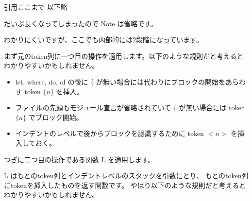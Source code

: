 \documentclass[mingoth,a4paper]{jsarticle}
\begin{document}



\dotfill 引用ここまで 以下略 \dotfill

だいぶ長くなってしまったので Note は省略です。

わかりにくいですが、ここでも内部的には2段階になっています。

まず元のtoken列に一つ目の操作を適用します。以下のような規則だと考えるとわかりやすいかもしれません。

\begin{itemize}
 \item let, where, do, of の後に \{ が無い場合には代わりにブロックの開始をあらわす token $\{n\}$ を挿入。
 \item ファイルの先頭もモジュール宣言が省略されていて \{ が無い場合には token $\{n\}$ でブロック開始。
 \item インデントのレベルで後からブロックを認識するために token $<n>$ を挿入しておく。
\end{itemize}

つぎに二つ目の操作である関数 L を適用します。

L はもとのtoken列とインデントレベルのスタックを引数にとり、
もとのtoken列にtokenを挿入したものを返す関数です。
やはり以下のような規則だと考えるとわかりやすいかもしれません。
\end{document}
